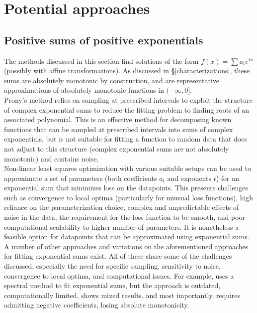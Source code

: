 \documentclass[12pt,a4paper]{article}
\begin{document}
\section{Potential approaches}
\label{approaches}

\subsection{Positive sums of positive exponentials}
\label{exponential_sums}

The methods discussed in this section find solutions of the form $f(x) = \sum a_t e^{tx}$ (possibly with affine transformations). As discussed in \S \ref{characterizations}, these sums are absolutely monotonic by construction, and are representative approximations of absolutely monotonic functions in $(-\infty,0]$.\\

Prony's method relies on sampling at prescribed intervals to exploit the structure of complex exponential sums to reduce the fitting problem to finding roots of an associated polynomial\cite{2002_holmstr_parameter_estimation_fitting_exponentials, 2021_keller_prony_methods,2020_chunaev_data_fitting_exponential_sums}. This is an effective method for decomposing known functions that can be sampled at prescribed intervals into sums of complex exponentials, but is not suitable for fitting a function to random data that does not adjust to this structure (complex exponential sums are not absolutely monotonic) and contains noise.\\

Non-linear least squares optimization with various suitable setups can be used to approximate a set of parameters (both coefficients $a_t$ and exponents $t$) for an exponential sum that minimizes loss on the datapoints\cite{2002_holmstr_parameter_estimation_fitting_exponentials,1980_evans_least_squares_exponential_sum}. This presents challenges such as convergence to local optima (particularly for unusual loss functions), high reliance on the parameterization choice, complex and unpredictable effects of noise in the data, the requirement for the loss function to be smooth, and poor computational scalability to higher number of parameters. It is nonetheless a feasible option for datapoints that can be approximated using exponential sums.\\

A number of other approaches and variations on the aforementioned approaches for fitting exponential sums exist. All of these share some of the challenges discussed, especially the need for specific sampling, sensitivity to noise, convergence to local optima, and computational issues. For example, \cite{1976_smith_decomposition_exponential_decays} uses a spectral method to fit exponential sums, but the approach is outdated, computationally limited, shows mixed results, and most importantly, requires admitting negative coefficients, losing absolute monotonicity.\\
\end{document}
